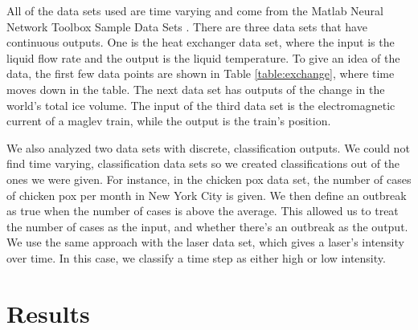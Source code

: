 \documentclass{acm_proc_article-sp}
\newcommand{\todo}[1]{\textcolor{orange}{\textbf{TODO}: #1}} %
\begin{document}
All of the data sets used are time varying and come from the Matlab Neural Network Toolbox Sample Data Sets \cite{data}. 
There are three data sets that have continuous outputs. One is the heat exchanger data set, where the input is the liquid flow rate and the output is the liquid temperature. 
To give an idea of the data, the first few data points are shown in Table \ref{table:exchange}, where time moves down in the table. 
The next data set has outputs of the change in the world's total ice volume. %
The input of the third data set is the electromagnetic current of a maglev train, while the output is the train's position.

We also analyzed two data sets with discrete, classification outputs. We could not find time varying, classification data sets so we created classifications out of the ones we were given. For instance, in the chicken pox data set, the number of cases of chicken pox per month in New York City is given. We then define an outbreak as true when the number of cases is above the average. This allowed us to treat the number of cases as the input, and whether there's an outbreak as the output. We use the same approach with the laser data set, which gives a laser's intensity over time. In this case, we classify a time step as either high or low intensity.


\section{Results}
\end{document}
